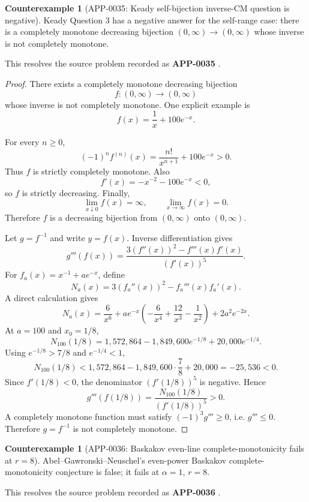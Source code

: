 \documentclass[11pt]{article}
\numberwithin{equation}{section}
\theoremstyle{definition}
\newtheorem{counterexample}[theorem]{Counterexample}
\theoremstyle{remark}
\newcommand{\1}{\mathbf 1}
\begin{document}
\begin{counterexample}[APP-0035: Keady self-bijection inverse-CM question is negative]
\label{res:keady-q3-self-bijection-inverse-cm-negative-answer}
Keady Question 3 has a negative answer for the self-range case: there is a completely monotone decreasing bijection \((0,\infty)\to(0,\infty)\) whose inverse is not completely monotone.

This resolves the source problem recorded as \textbf{APP-0035} \cite{app-app-0035-source}.
\end{counterexample}

\begin{proof}
There exists a completely monotone decreasing bijection
\[
f:(0,\infty)\to(0,\infty)
\]
whose inverse is not completely monotone. One explicit example is
\[
f(x)=\frac1x+100e^{-x}.
\]

For every \(n\ge0\),
\[
(-1)^n f^{(n)}(x)=\frac{n!}{x^{n+1}}+100e^{-x}>0.
\]
Thus \(f\) is strictly completely monotone. Also
\[
f'(x)=-x^{-2}-100e^{-x}<0,
\]
so \(f\) is strictly decreasing. Finally,
\[
\lim_{x\downarrow0}f(x)=\infty,
\qquad
\lim_{x\to\infty}f(x)=0.
\]
Therefore \(f\) is a decreasing bijection from \((0,\infty)\) onto \((0,\infty)\).

Let \(g=f^{-1}\) and write \(y=f(x)\). Inverse differentiation gives
\[
g'''(f(x))=\frac{3(f''(x))^2-f'''(x)f'(x)}{(f'(x))^5}.
\]
For \(f_a(x)=x^{-1}+ae^{-x}\), define
\[
N_a(x)=3(f_a''(x))^2-f_a'''(x)f_a'(x).
\]
A direct calculation gives
\[
N_a(x)=\frac6{x^6}+ae^{-x}\left(-\frac6{x^4}+\frac{12}{x^3}-\frac1{x^2}\right)+2a^2e^{-2x}.
\]
At \(a=100\) and \(x_0=1/8\),
\[
N_{100}(1/8)=1{,}572{,}864-1{,}849{,}600e^{-1/8}+20{,}000e^{-1/4}.
\]
Using \(e^{-1/8}>7/8\) and \(e^{-1/4}<1\),
\[
N_{100}(1/8)<1{,}572{,}864-1{,}849{,}600\cdot\frac78+20{,}000=-25{,}536<0.
\]
Since \(f'(1/8)<0\), the denominator \((f'(1/8))^5\) is negative. Hence
\[
g'''(f(1/8))=\frac{N_{100}(1/8)}{(f'(1/8))^5}>0.
\]
A completely monotone function must satisfy \((-1)^3g'''\ge0\), i.e. \(g'''\le0\). Therefore \(g=f^{-1}\) is not completely monotone.
\end{proof}

\begin{counterexample}[APP-0036: Baskakov even-line complete-monotonicity fails at \(r=8\)]
\label{res:not-baskakov-higher-power-even-conjecture}
Abel--Gawronski--Neuschel's even-power Baskakov complete-monotonicity conjecture is false; it fails at \(\alpha=1\), \(r=8\).

This resolves the source problem recorded as \textbf{APP-0036} \cite{abel-gawronski-neuschel}.
\end{counterexample}
\end{document}
